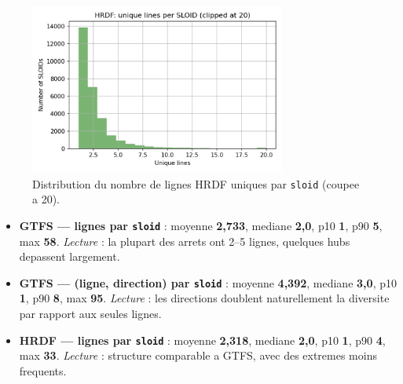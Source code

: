 \begin{figure}[H]
  \centering
  \includegraphics[width=0.75\textwidth]{../figures/chap4/hist_hrdf_lines_per_sloid.png}
  \caption{Distribution du nombre de lignes HRDF uniques par \texttt{sloid} (coupee a 20).}
\end{figure}


\begin{itemize}
  \item \textbf{GTFS --- lignes par \texttt{sloid}} : moyenne \textbf{2,733}, mediane \textbf{2,0}, p10 \textbf{1}, p90 \textbf{5}, max \textbf{58}. \emph{Lecture} : la plupart des arrets ont 2--5 lignes, quelques hubs depassent largement.
  \item \textbf{GTFS --- (ligne, direction) par \texttt{sloid}} : moyenne \textbf{4,392}, mediane \textbf{3,0}, p10 \textbf{1}, p90 \textbf{8}, max \textbf{95}. \emph{Lecture} : les directions doublent naturellement la diversite par rapport aux seules lignes.
  \item \textbf{HRDF --- lignes par \texttt{sloid}} : moyenne \textbf{2,318}, mediane \textbf{2,0}, p10 \textbf{1}, p90 \textbf{4}, max \textbf{33}. \emph{Lecture} : structure comparable a GTFS, avec des extremes moins frequents.
\end{itemize}

